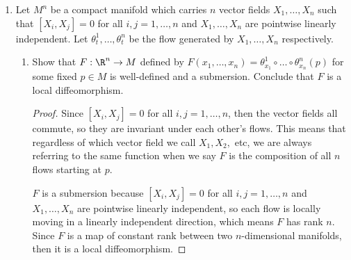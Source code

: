 \documentclass[12pt,letterpaper]{article}
\begin{document}
\begin{enumerate}
\item Let $M^n$ be a compact manifold which carries $n$ vector fields $X_1, \dots , X_n$ such that $[X_i, X_j] = 0$ for all $i, j = 1, \dots , n$ and $X_1, \dots , X_n$ are pointwise linearly independent. Let $\theta^1_t, \dots , \theta^n_t$ be the flow generated by $X_1, \dots , X_n$ respectively.
	\begin{enumerate}
	\item Show that $F : \R^n \to M$ defined by $F(x_1, \dots , x_n) = \theta^1_{x_1} \circ \dots \circ \theta^n_{x_n}(p)$ for some fixed $p \in M$ is
well-defined and a submersion. Conclude that $F$ is a local diffeomorphism.
	
	\begin{proof}
	Since $[X_i, X_j] = 0$ for all $i, j = 1, \dots , n$, then the vector fields all commute, so they are invariant under each other's flows. This means that regardless of which vector field we call $X_1, X_2,$ etc, we are always referring to the same function when we say $F$ is the composition of all $n$ flows starting at $p$. 
	
	$F$ is a submersion because $[X_i, X_j] = 0$ for all $i, j = 1, \dots , n$ and $X_1, \dots , X_n$ are pointwise linearly independent, so each flow is locally moving in a linearly independent direction, which means $F$ has rank $n$. Since $F$ is a map of constant rank between two $n$-dimensional manifolds, then it is a local diffeomorphism. 
	\end{proof}
	\end{enumerate}


\end{enumerate}
\end{document}
